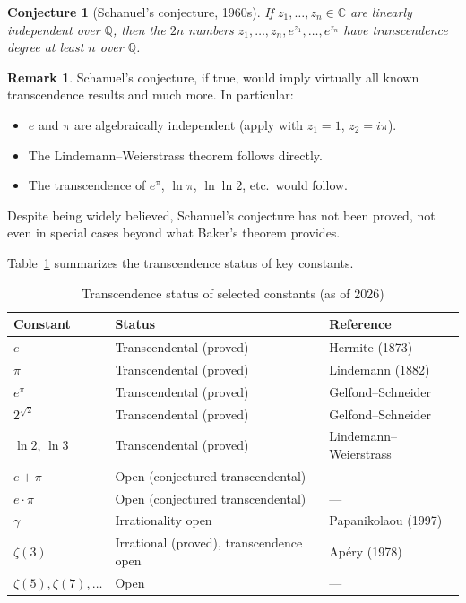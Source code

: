 \documentclass[12pt,a4paper]{amsart}
\newtheorem{conjecture}[theorem]{Conjecture}
\theoremstyle{definition}
\newtheorem{remark}[theorem]{Remark}
\begin{document}
\begin{conjecture}[Schanuel's conjecture, 1960s]
\label{conj:schanuel}
If $z_1, \ldots, z_n \in \mathbb{C}$ are linearly independent over $\mathbb{Q}$,
then the $2n$ numbers $z_1, \ldots, z_n, e^{z_1}, \ldots, e^{z_n}$ have
transcendence degree at least $n$ over $\mathbb{Q}$.
\end{conjecture}

\begin{remark}
Schanuel's conjecture, if true, would imply virtually all known transcendence
results and much more. In particular:
\begin{itemize}[leftmargin=2em]
  \item $e$ and $\pi$ are algebraically independent (apply with $z_1 = 1$,
        $z_2 = i\pi$).
  \item The Lindemann--Weierstrass theorem follows directly.
  \item The transcendence of $e^\pi$, $\ln\pi$, $\ln\ln 2$, etc.\ would follow.
\end{itemize}
Despite being widely believed, Schanuel's conjecture has not been proved,
not even in special cases beyond what Baker's theorem provides.
\end{remark}

Table~\ref{tab:status} summarizes the transcendence status of key constants.

\begin{table}[ht]
\centering
\caption{Transcendence status of selected constants (as of 2026)}
\label{tab:status}
\begin{tabular}{lll}
\toprule
Constant & Status & Reference \\
\midrule
$e$ & Transcendental (proved) & Hermite (1873) \\
$\pi$ & Transcendental (proved) & Lindemann (1882) \\
$e^\pi$ & Transcendental (proved) & Gelfond--Schneider \\
$2^{\sqrt{2}}$ & Transcendental (proved) & Gelfond--Schneider \\
$\ln 2$, $\ln 3$ & Transcendental (proved) & Lindemann--Weierstrass \\
$e + \pi$ & Open (conjectured transcendental) & --- \\
$e \cdot \pi$ & Open (conjectured transcendental) & --- \\
$\gamma$ & Irrationality open & Papanikolaou (1997) \\
$\zeta(3)$ & Irrational (proved), transcendence open & Ap\'ery (1978) \\
$\zeta(5), \zeta(7), \ldots$ & Open & --- \\
\bottomrule
\end{tabular}
\end{table}
\end{document}
